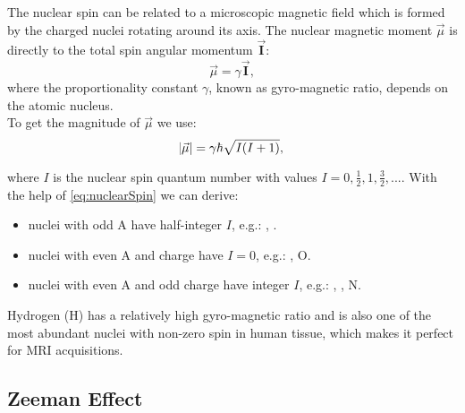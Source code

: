 The nuclear spin can be related to a microscopic magnetic field which is formed by the charged nuclei rotating around its axis. The nuclear magnetic moment $\vec{\mu}$ is directly to the total spin angular momentum $\vec{\mathbf{I}}$:
\begin{equation}\label{eq:muNuclearSpin}
\vec{\mu} = \gamma\vec{\mathbf{I}},
\end{equation}  
where the proportionality constant $\gamma$, known as gyro-magnetic ratio, depends on the atomic nucleus.\\

To get the magnitude of $\vec{\mu}$ we use:
\begin{equation}
\abs{\vec{\mu}} = \gamma\hbar\sqrt{I(I+1)},
\end{equation}

where $I$ is the nuclear spin quantum number with values $I=0,\frac{1}{2},1,\frac{3}{2},...$. With the help of \ref{eq:nuclearSpin} we can derive:
\begin{itemize}
\item nuclei with odd A have half-integer $I$, e.g.: , .
\item nuclei with even A and charge have $I=0$, e.g.: , \isotope[16]O.
\item nuclei with even A and odd charge have integer $I$, e.g.: , , \isotope[14]N.
\end{itemize}

Hydrogen (\isotope[1]H) has a relatively high gyro-magnetic ratio and is also one of the most abundant nuclei with non-zero spin in human tissue, which makes it perfect for MRI acquisitions.\\

\subsection{Zeeman Effect}\label{subs:zeemanEffect}

